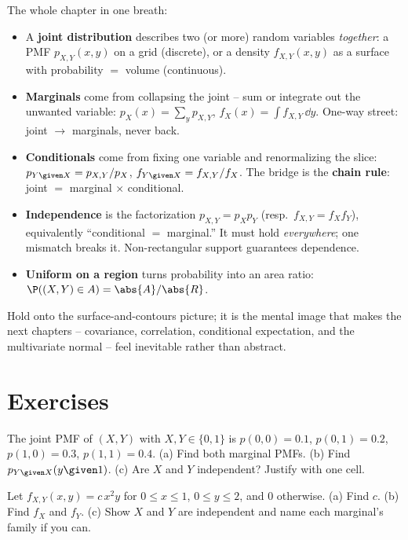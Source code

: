 \begin{recoverybox}
The whole chapter in one breath:
\begin{itemize}
  \item A \textbf{joint distribution} describes two (or more) random variables
        \emph{together}: a PMF $p_{X,Y}(x,y)$ on a grid (discrete), or a density
        $f_{X,Y}(x,y)$ as a surface with probability $=$ volume (continuous).
  \item \textbf{Marginals} come from collapsing the joint -- sum or integrate out
        the unwanted variable: $p_X(x)=\sum_y p_{X,Y}$,
        $f_X(x)=\int f_{X,Y}\,\dd y$. One-way street: joint $\to$ marginals,
        never back.
  \item \textbf{Conditionals} come from fixing one variable and renormalizing the
        slice: $p_{Y\given X}=p_{X,Y}/p_X$, $f_{Y\given X}=f_{X,Y}/f_X$. The
        bridge is the \textbf{chain rule}: joint $=$ marginal $\times$ conditional.
  \item \textbf{Independence} is the factorization
        $p_{X,Y}=p_X p_Y$ (resp.\ $f_{X,Y}=f_X f_Y$), equivalently
        ``conditional $=$ marginal.'' It must hold \emph{everywhere}; one
        mismatch breaks it. Non-rectangular support guarantees dependence.
  \item \textbf{Uniform on a region} turns probability into an area ratio:
        $\P((X,Y)\in A) = \abs{A}/\abs{R}$.
\end{itemize}
Hold onto the surface-and-contours picture; it is the mental image that makes the
next chapters -- covariance, correlation, conditional expectation, and the
multivariate normal -- feel inevitable rather than abstract.
\end{recoverybox}

\section{Exercises}
\label{ch13:exercises}

\begin{exercise}
\label{ch13:ex-table}
The joint PMF of $(X,Y)$ with $X,Y\in\{0,1\}$ is
$p(0,0)=0.1$, $p(0,1)=0.2$, $p(1,0)=0.3$, $p(1,1)=0.4$.
(a) Find both marginal PMFs. (b) Find $p_{Y\given X}(y\given 1)$. (c) Are $X$ and
$Y$ independent? Justify with one cell.
\end{exercise}

\begin{exercise}
\label{ch13:ex-normalize}
Let $f_{X,Y}(x,y) = c\,x^2 y$ for $0\le x\le 1$, $0\le y\le 2$, and $0$
otherwise. (a) Find $c$. (b) Find $f_X$ and $f_Y$. (c) Show $X$ and $Y$ are
independent and name each marginal's family if you can.
\end{exercise}

